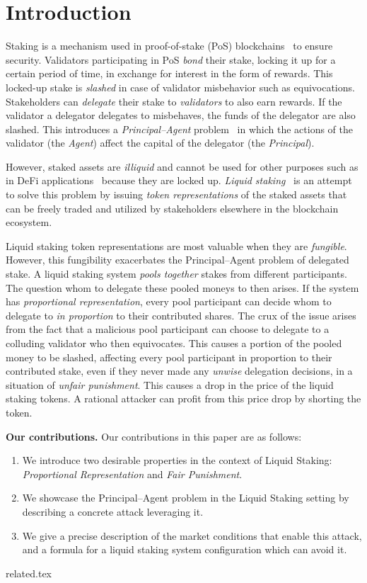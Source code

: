 \section{Introduction}

Staking is a mechanism used in proof-of-stake (PoS)
blockchains~\cite{2018tendermint,buchman2016tendermint,ouroboros,algorand,casper}
to ensure security. Validators participating in PoS
\emph{bond} their stake, locking it up for a certain period of time,
in exchange for interest in the form of rewards.
This locked-up stake is \emph{slashed} in case of validator misbehavior
such as equivocations.
Stakeholders can \emph{delegate} their stake to \emph{validators} to also
earn rewards. If the validator a delegator delegates to misbehaves,
the funds of the delegator are also slashed. This introduces a
\emph{Principal--Agent} problem~\cite{jensen1976,wealthofnations}
in which the actions of the validator (the \emph{Agent})
affect the capital of the delegator (the \emph{Principal}).

However, staked assets are \emph{illiquid} and cannot be used for
other purposes such as in DeFi applications~\cite{defi-sok}
because they are locked up.
\emph{Liquid staking}~\cite{liquid-staking-report}
is an attempt to solve this problem by issuing
\emph{token representations} of the staked assets that can be freely traded
and utilized by stakeholders elsewhere in the blockchain ecosystem.

Liquid staking token representations are most valuable when they are
\emph{fungible}. However, this fungibility exacerbates the Principal--Agent
problem of delegated stake.
A liquid staking system \emph{pools together} stakes from different participants.
The question whom to delegate these pooled moneys to then arises.
If the system has \emph{proportional representation}, every pool participant
can decide whom to delegate to \emph{in proportion} to their contributed shares.
The crux of the issue arises from the fact
that a malicious pool participant can choose to delegate to
a colluding validator who then equivocates. This causes a portion
of the pooled money to be slashed, affecting every pool participant
in proportion to their contributed stake, even if they never made
any \emph{unwise} delegation decisions, in a situation of
\emph{unfair punishment}. This causes a drop in the price of the
liquid staking tokens. A rational attacker can profit from this price
drop by shorting the token.

\noindent
\textbf{Our contributions.} Our contributions in this paper are as follows:
\begin{enumerate}
    \item We introduce two desirable properties in the context of Liquid Staking:
          \emph{Proportional Representation} and \emph{Fair Punishment}.
    \item We showcase the Principal--Agent problem in the Liquid Staking
          setting by describing a concrete attack leveraging it.
    \item We give a precise description of the market conditions that enable
          this attack, and a formula for a liquid staking system configuration
          which can avoid it.
\end{enumerate}

{related.tex}
